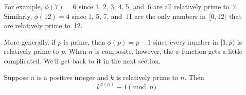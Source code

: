For example, $\phi(7) = 6$ since 1, 2, 3, 4, 5, and~6
are all relatively prime to~7.  Similarly, $\phi(12) = 4$ since 1, 5,
7, and~11 are the only numbers in~$[0, 12)$ that are relatively prime
  to~12.

More generally, if $p$ is prime, then $\phi(p) = p - 1$ since every
number in $[1,p)$ is relatively prime to $p$.  When $n$ is composite,
  however, the $\phi$ function gets a little complicated.  We'll get
  back to it in the next section.

\begin{theorem}
Suppose $n$ is a positive integer and $k$ is relatively prime to $n$.  Then
\begin{equation*}
    k^{\phi(n)} \equiv 1 \pmod{n}
\end{equation*}
\end{theorem}

